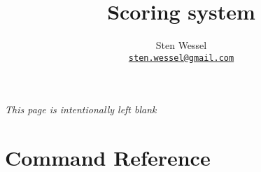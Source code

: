 \documentclass{techdoc}
\title{Scoring system}
\author{Sten Wessel\\\href{mailto:sten.wessel@gmail.com}{\texttt{sten.wessel@gmail.com}}}
\begin{document}
    \maketitle

    \clearpage
    \thispagestyle{empty}
    \begin{center}
        \begin{minipage}{.6\textwidth}\centering
        \textit{This page is intentionally left blank}
        \end{minipage}
    \end{center}
    \clearpage

    \tableofcontents

    \part{Command Reference}
\end{document}
